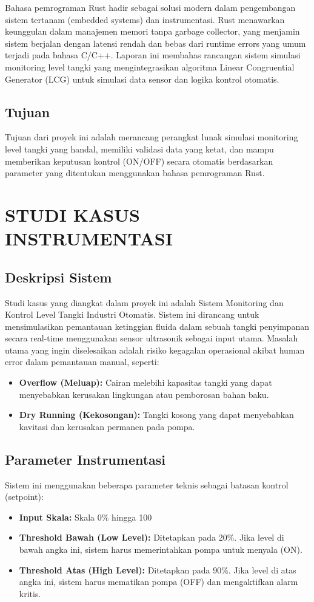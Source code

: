 \documentclass[12pt]{article}
\begin{document}
Bahasa pemrograman Rust hadir sebagai solusi modern dalam pengembangan sistem tertanam (embedded systems) dan instrumentasi. Rust menawarkan keunggulan dalam manajemen memori tanpa garbage collector, yang menjamin sistem berjalan dengan latensi rendah dan bebas dari runtime errors yang umum terjadi pada bahasa C/C++. Laporan ini membahas rancangan sistem simulasi monitoring level tangki yang mengintegrasikan algoritma Linear Congruential Generator (LCG) untuk simulasi data sensor dan logika kontrol otomatis.

\subsection{Tujuan}
Tujuan dari proyek ini adalah merancang perangkat lunak simulasi monitoring level tangki yang handal, memiliki validasi data yang ketat, dan mampu memberikan keputusan kontrol (ON/OFF) secara otomatis berdasarkan parameter yang ditentukan menggunakan bahasa pemrograman Rust.

\section{STUDI KASUS INSTRUMENTASI}
\subsection{Deskripsi Sistem}
Studi kasus yang diangkat dalam proyek ini adalah Sistem Monitoring dan Kontrol Level Tangki Industri Otomatis. Sistem ini dirancang untuk mensimulasikan pemantauan ketinggian fluida dalam sebuah tangki penyimpanan secara real-time menggunakan sensor ultrasonik sebagai input utama.  Masalah utama yang ingin diselesaikan adalah risiko kegagalan operasional akibat human error dalam pemantauan manual, seperti:
\begin{itemize}
    \item \textbf{Overflow (Meluap):} Cairan melebihi kapasitas tangki yang dapat menyebabkan kerusakan lingkungan atau pemborosan bahan baku.
    \item \textbf{Dry Running (Kekosongan):} Tangki kosong yang dapat menyebabkan kavitasi dan kerusakan permanen pada pompa.
\end{itemize}

\subsection{Parameter Instrumentasi}
Sistem ini menggunakan beberapa parameter teknis sebagai batasan kontrol (setpoint):
\begin{itemize}
    \item \textbf{Input Skala:} Skala 0\% hingga 100%
    \item \textbf{Threshold Bawah (Low Level):} Ditetapkan pada 20\%. Jika level di bawah angka ini, sistem harus memerintahkan pompa untuk menyala (ON).
    \item \textbf {Threshold Atas (High Level):} Ditetapkan pada 90\%. Jika level di atas angka ini, sistem harus mematikan pompa (OFF) dan mengaktifkan alarm kritis.
\end{itemize}
    
\end{document}
